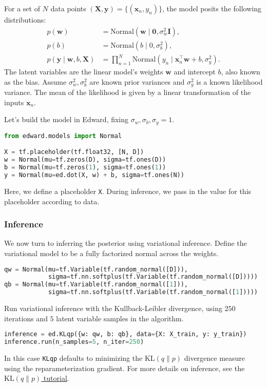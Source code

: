 For a set of $N$ data points $(\mathbf{X},\mathbf{y})=\{(\mathbf{x}_n, y_n)\}$,
the model posits the following distributions:
\begin{align*}
  p(\mathbf{w})
  &=
  \text{Normal}(\mathbf{w} \mid \mathbf{0}, \sigma_w^2\mathbf{I}),
  \\[1.5ex]
  p(b)
  &=
  \text{Normal}(b \mid 0, \sigma_b^2),
  \\
  p(\mathbf{y} \mid \mathbf{w}, b, \mathbf{X})
  &=
  \prod_{n=1}^N
  \text{Normal}(y_n \mid \mathbf{x}_n^\top\mathbf{w} + b, \sigma_y^2).
\end{align*}
The latent variables are the linear model's weights $\mathbf{w}$ and
intercept $b$, also known as the bias.
Assume $\sigma_w^2,\sigma_b^2$ are known prior variances and $\sigma_y^2$ is a
known likelihood variance. The mean of the likelihood is given by a
linear transformation of the inputs $\mathbf{x}_n$.

Let's build the model in Edward, fixing $\sigma_w,\sigma_b,\sigma_y=1$.
\begin{lstlisting}[language=Python]
from edward.models import Normal

X = tf.placeholder(tf.float32, [N, D])
w = Normal(mu=tf.zeros(D), sigma=tf.ones(D))
b = Normal(mu=tf.zeros(1), sigma=tf.ones(1))
y = Normal(mu=ed.dot(X, w) + b, sigma=tf.ones(N))
\end{lstlisting}
Here, we define a placeholder \texttt{X}. During inference, we pass in
the value for this placeholder according to data.

\subsubsection{Inference}

We now turn to inferring the posterior using variational inference.
Define the variational model to be a fully factorized normal across
the weights.
\begin{lstlisting}[language=Python]
qw = Normal(mu=tf.Variable(tf.random_normal([D])),
            sigma=tf.nn.softplus(tf.Variable(tf.random_normal([D]))))
qb = Normal(mu=tf.Variable(tf.random_normal([1])),
            sigma=tf.nn.softplus(tf.Variable(tf.random_normal([1]))))
\end{lstlisting}

Run variational inference with the Kullback-Leibler divergence, using
$250$ iterations and $5$ latent variable samples in the algorithm.
\begin{lstlisting}[language=Python]
inference = ed.KLqp({w: qw, b: qb}, data={X: X_train, y: y_train})
inference.run(n_samples=5, n_iter=250)
\end{lstlisting}
In this case \texttt{KLqp} defaults to minimizing the
$\text{KL}(q\|p)$ divergence measure using the reparameterization
gradient.
For more details on inference, see the \href{/tutorials/klqp}{$\text{KL}(q\|p)$ tutorial}.


